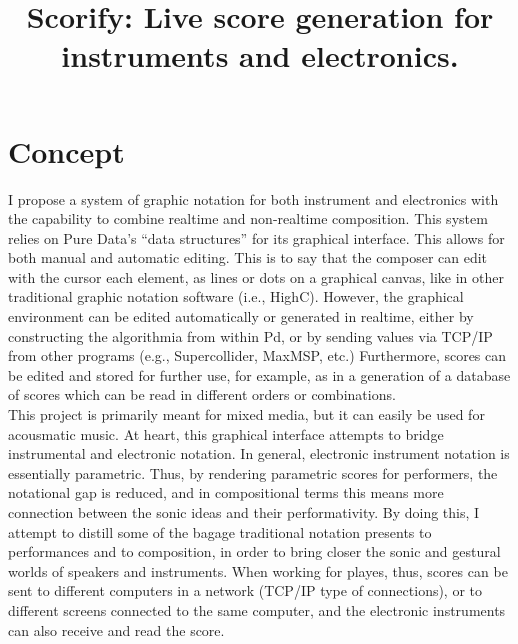 \documentclass{article}
\title{Scorify: Live score generation for instruments and electronics.}
\date{}
\begin{document}
 
\maketitle


\section{Concept}

\noindent I propose a system of graphic notation for both instrument and electronics with the capability to combine realtime and non-realtime composition. This system relies on Pure Data's ``data structures'' for its graphical interface. This allows for both manual and automatic editing. This is to say that the composer can edit with the cursor each element, as lines or dots on a graphical canvas, like in other traditional graphic notation software (i.e., HighC). However, the graphical environment can be edited automatically or generated in realtime, either by constructing the algorithmia from within Pd, or by sending values via TCP/IP from other programs (e.g., Supercollider, MaxMSP, etc.) Furthermore, scores can be edited and stored for further use, for example, as in a generation of a database of scores which can be read in different orders or combinations. \\

\noindent This project is primarily meant for mixed media, but it can easily be used for acousmatic music. At heart, this graphical interface attempts to bridge instrumental and electronic notation. In general, electronic instrument notation is essentially parametric. Thus, by rendering parametric scores for performers, the notational gap is reduced, and in compositional terms this means more connection between the sonic ideas and their performativity. By doing this, I attempt to distill some of the bagage traditional notation presents to performances and to composition, in order to bring closer the sonic and gestural worlds of speakers and instruments. When working for playes, thus, scores can be sent to different computers in a network (TCP/IP type of connections), or to different screens connected to the same computer, and the electronic instruments can also receive and read the score.\\
\end{document}
